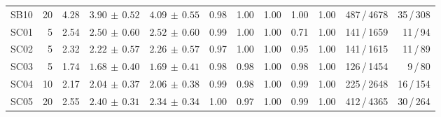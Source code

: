 \begin{table}[htbp]
{\begin{tabular}{l r r r r r r r r r r r}
    SB10 & 20 & 4.28 & $3.90{\scriptstyle\,\pm\,0.52}$ & $4.09{\scriptstyle\,\pm\,0.55}$ & 0.98 & 1.00 & 1.00 & 1.00 & 1.00 & 487\,/\,4678 & 35\,/\,308 \\
    \addlinespace
    SC01 &  5 & 2.54 & $2.50{\scriptstyle\,\pm\,0.60}$ & $2.52{\scriptstyle\,\pm\,0.60}$ & 0.99 & 1.00 & 1.00 & 0.71 & 1.00 & 141\,/\,1659 & 11\,/\,94 \\
    SC02 &  5 & 2.32 & $2.22{\scriptstyle\,\pm\,0.57}$ & $2.26{\scriptstyle\,\pm\,0.57}$ & 0.97 & 1.00 & 1.00 & 0.95 & 1.00 & 141\,/\,1615 & 11\,/\,89 \\
    SC03 &  5 & 1.74 & $1.68{\scriptstyle\,\pm\,0.40}$ & $1.69{\scriptstyle\,\pm\,0.41}$ & 0.98 & 0.98 & 1.00 & 0.98 & 1.00 & 126\,/\,1454 & 9\,/\,80 \\
    SC04 & 10 & 2.17 & $2.04{\scriptstyle\,\pm\,0.37}$ & $2.06{\scriptstyle\,\pm\,0.38}$ & 0.99 & 0.98 & 1.00 & 0.99 & 1.00 & 225\,/\,2648 & 16\,/\,154 \\
    SC05 & 20 & 2.55 & $2.40{\scriptstyle\,\pm\,0.31}$ & $2.34{\scriptstyle\,\pm\,0.34}$ & 1.00 & 0.97 & 1.00 & 0.99 & 1.00 & 412\,/\,4365 & 30\,/\,264 \\
    \bottomrule
  \end{tabular}%
  }
\end{table}

